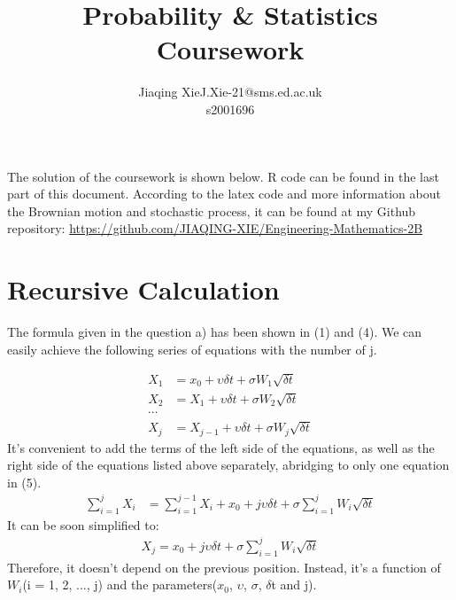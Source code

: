\documentclass[twoside,11pt]{article}
\makeatletter
\newcommand\studentName{Jiaqing Xie}                  %
\newcommand\studentEmail{J.Xie-21@sms.ed.ac.uk}          %
\newcommand\studentNumber{s2001696}                %
\makeatother
\begin{document}
    
    \title{Probability \& Statistics Coursework}
    
    \author{\name \studentName \email \studentEmail \\
    \studentNumber
    \addr
    }
    
    \maketitle



The solution of the coursework is shown below. R code can be found in the last part of this document. According to the latex code and more information about the Brownian motion and stochastic process, it can be found at my Github repository: \url{https://github.com/JIAQING-XIE/Engineering-Mathematics-2B}


 \renewcommand\thesection{\alph{section}}
\section{Recursive Calculation}
\label{sec:background}


The formula given in the question a) has been shown in (1) and (4). We can easily achieve the following series of equations with the number of j.


\begin{align}
    X_{1} &= x_{0} + \upsilon\delta t + \sigma W_{1}\sqrt{\delta t}\\
    X_{2} &= X_{1} + \upsilon\delta t + \sigma W_{2}\sqrt{\delta t}\\
    \cdots\\
    X_{j} &= X_{j-1} + \upsilon\delta t + \sigma W_{j}\sqrt{\delta t}
\end{align}
It's convenient to add the terms of the left side of the equations, as well as the right side of the equations listed above separately, abridging to only one equation in (5).
\begin{align}
\sum_{i=1}^{j}X_{i} &= \sum_{i=1}^{j-1}X_{i} + x_{0} +j\upsilon\delta t+\sigma \sum_{i=1}^{j}W_{i}\sqrt{\delta t}
\end{align}
It can be soon simplified to:
\begin{align}
X_{j} =  x_{0} +j\upsilon\delta t+\sigma \sum_{i=1}^{j}W_{i}\sqrt{\delta t}
\end{align}
Therefore, it doesn't depend on the previous position. Instead, it's a function of $W_{i}$(i = 1, 2, ..., j) and the parameters($x_{0}$, $\upsilon$, $\sigma$, $\delta$t and j).
\end{document}
